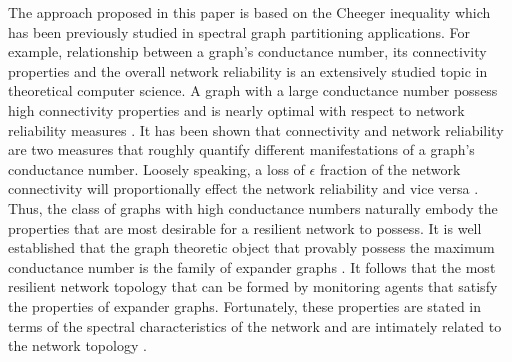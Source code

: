 \documentclass[reqno,8pt]{amsart}
\theoremstyle{definition}
\theoremstyle{remark}
\numberwithin{equation}{section}
\begin{document}
\medskip

The approach proposed in this paper is based on the Cheeger inequality which has been previously studied in spectral graph partitioning applications. For example, relationship between a graph's conductance number, its connectivity properties and the overall network reliability is an extensively studied topic in theoretical computer science\cite{Shahrokhi1990}. A graph with a large conductance number possess high connectivity properties and is nearly optimal with respect to network reliability measures \cite{Krebs2011}. It has been shown that connectivity and network reliability are two measures that roughly quantify different manifestations of a graph's conductance number. Loosely speaking, a loss of $\epsilon$ fraction of the network connectivity will proportionally effect the network reliability and vice versa \cite{Krebs2011}. Thus, the class of graphs with high conductance numbers naturally embody the properties that are most desirable for a resilient network to possess. It is well established that the graph theoretic object that provably possess the maximum conductance number is the family of expander graphs \cite{Lub2012,Wig2006}. It follows that the most resilient network topology that can be formed by monitoring agents that satisfy the  properties of expander graphs. Fortunately, these properties are stated in terms of the spectral characteristics of the network and are intimately related to the network topology \cite{Chung97}. %

 
\end{document}
